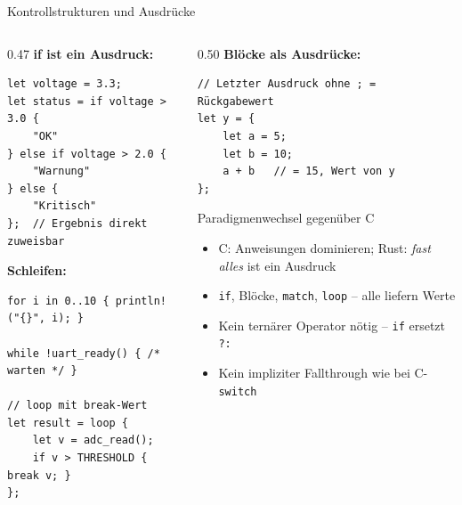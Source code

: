 \documentclass[%
  aspectratio=169,
  10pt
]{beamer}
\begin{document}
\begin{frame}[fragile]{Kontrollstrukturen und Ausdrücke}
  \begin{columns}[T]
    \begin{column}{0.47\textwidth}
      \textbf{if ist ein Ausdruck:}
\begin{lstlisting}
let voltage = 3.3;
let status = if voltage > 3.0 {
    "OK"
} else if voltage > 2.0 {
    "Warnung"
} else {
    "Kritisch"
};  // Ergebnis direkt zuweisbar
\end{lstlisting}
      \textbf{Schleifen:}
\begin{lstlisting}
for i in 0..10 { println!("{}", i); }

while !uart_ready() { /* warten */ }

// loop mit break-Wert
let result = loop {
    let v = adc_read();
    if v > THRESHOLD { break v; }
};
\end{lstlisting}
    \end{column}
    \begin{column}{0.50\textwidth}
      \textbf{Blöcke als Ausdrücke:}
\begin{lstlisting}
// Letzter Ausdruck ohne ; = Rückgabewert
let y = {
    let a = 5;
    let b = 10;
    a + b   // = 15, Wert von y
};
\end{lstlisting}
      \begin{block}{Paradigmenwechsel gegenüber C}
        \small
        \begin{itemize}
          \item C: Anweisungen dominieren;
                Rust: \emph{fast alles} ist ein Ausdruck
          \item \texttt{if}, Blöcke, \texttt{match},
                \texttt{loop} -- alle liefern Werte
          \item Kein ternärer Operator nötig --
                \texttt{if} ersetzt \texttt{?:}
          \item Kein impliziter Fallthrough wie bei C-\texttt{switch}
        \end{itemize}
      \end{block}
    \end{column}
  \end{columns}
\end{frame}
\end{document}
